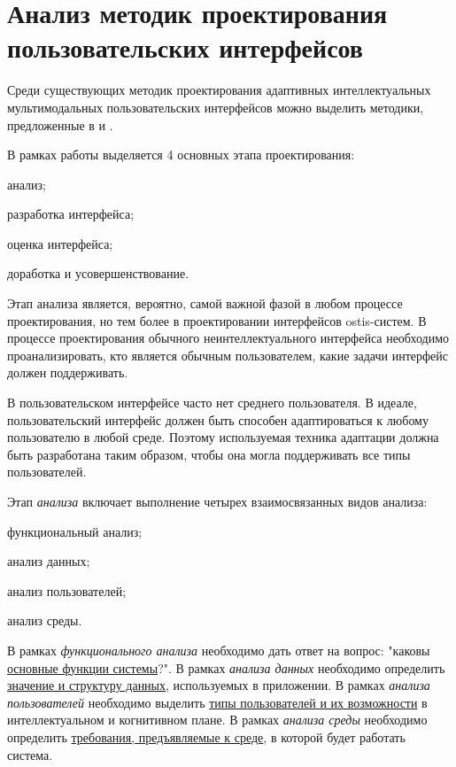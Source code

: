 \section{Анализ методик проектирования пользовательских интерфейсов}
\label{sec_analysis_UI_design_methodologies}

Среди существующих методик проектирования адаптивных интеллектуальных мультимодальных пользовательских интерфейсов можно выделить методики,
предложенные в  и  .

В рамках работы  выделяется 4 основных этапа проектирования:
\begin{textitemize}
    \item анализ;
    \item разработка интерфейса;
    \item оценка интерфейса;
    \item доработка и усовершенствование.
\end{textitemize}

Этап анализа является, вероятно, самой важной фазой в любом процессе проектирования, но тем более в проектировании интерфейсов ostis-систем. В
процессе проектирования обычного неинтеллектуального интерфейса
необходимо проанализировать, кто является обычным пользователем, какие задачи интерфейс должен поддерживать. 

В пользовательском интерфейсе часто нет среднего пользователя.
В идеале, пользовательский интерфейс должен быть способен адаптироваться к любому пользователю в любой среде. Поэтому используемая техника адаптации должна быть разработана таким образом, чтобы она могла поддерживать все типы пользователей.

Этап \textit{анализа} включает выполнение четырех взаимосвязанных видов анализа:
\begin{textitemize}
    \item функциональный анализ;
    \item анализ данных;
    \item анализ пользователей;
    \item анализ среды.
\end{textitemize}

В рамках \textit{функционального анализа} необходимо дать ответ на вопрос: "каковы \uline{основные функции системы}?".
В рамках \textit{анализа данных} необходимо определить \uline{значение и структуру данных}, используемых в приложении.
В рамках \textit{анализа пользователей} необходимо выделить \uline{типы пользователей и их возможности} в интеллектуальном
и когнитивном плане.
В рамках \textit{анализа среды} необходимо определить \uline{требования, предъявляемые к среде}, в которой будет работать система.

